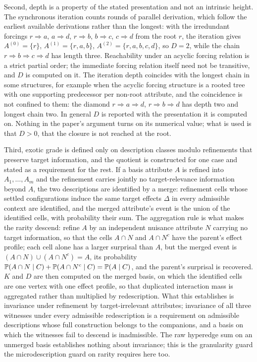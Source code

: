 Second, depth is a property of the stated presentation and not an intrinsic
height. The synchronous iteration counts rounds of parallel derivation, which
follow the earliest available derivations rather than the longest: with the
irredundant forcings $r\Rightarrow a$, $a\Rightarrow d$, $r\Rightarrow b$,
$b\Rightarrow c$, $c\Rightarrow d$ from the root $r$, the iteration gives
$A^{(0)}=\{r\}$, $A^{(1)}=\{r,a,b\}$, $A^{(2)}=\{r,a,b,c,d\}$, so $D=2$,
while the chain $r\Rightarrow b\Rightarrow c\Rightarrow d$ has length three.
Reachability under an acyclic forcing relation is a strict partial order; the
immediate forcing relation itself need not be transitive, and $D$ is computed
on it. The iteration depth coincides with the longest chain in some
structures, for example when the acyclic forcing structure is a rooted tree
with one supporting predecessor per non-root attribute, and the coincidence
is not confined to them: the diamond $r\Rightarrow a\Rightarrow d$,
$r\Rightarrow b\Rightarrow d$ has depth two and longest chain two. In
general $D$ is reported with the presentation it is computed on. Nothing in
the paper's argument turns on its numerical value; what is used is that
$D>0$, that the closure is not reached at the root.

Third, exotic grade is defined only on description classes modulo
refinements that preserve target information, and the quotient is constructed
for one case and stated as a requirement for the rest.
If a basis attribute $A$ is refined into $A_1,\dots,A_m$ and the refinement
carries jointly no target-relevance information beyond $A$, the two
descriptions are identified by a merge: refinement cells whose settled
configurations induce the same target effects $\Delta$ in every admissible
context are identified, and the merged attribute's event is the union of the
identified cells, with probability their sum. The aggregation rule is what
makes the rarity descend: refine $A$ by an independent nuisance attribute $N$
carrying no target information, so that the cells $A\cap N$ and
$A\cap N^{c}$ have the parent's effect profile; each cell alone has a larger
surprisal than $A$, but the merged event is $(A\cap N)\cup(A\cap N^{c})=A$,
its probability $\mathbb{P}(A\cap N\mid C)+\mathbb{P}(A\cap N^{c}\mid C)=\mathbb{P}(A\mid C)$,
and the parent's surprisal is recovered. $K$ and $D$ are then computed on the
merged basis, on which the identified cells are one vertex with one effect
profile, so that duplicated interaction mass is aggregated rather than
multiplied by redescription. What this establishes is invariance under
refinement by target-irrelevant attributes; invariance of all three witnesses
under every admissible redescription is a requirement on admissible
descriptions whose full construction belongs to the companions, and a basis
on which the witnesses fail to descend is inadmissible. The raw hyperedge sum
on an unmerged basis establishes nothing about invariance; this is the
granularity guard the microdescription guard on rarity requires here too.

